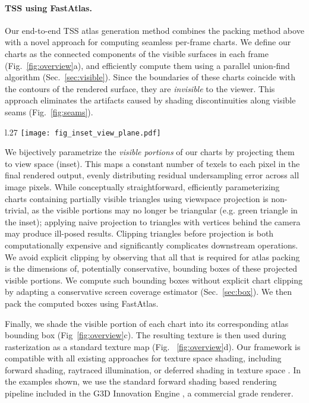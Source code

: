 \paragraph*{TSS using FastAtlas.}
Our end-to-end TSS atlas generation method combines the packing method above with a novel approach for computing seamless per-frame charts. 
We define our charts as the connected components of the visible surfaces in each frame (Fig.~\ref{fig:overview}a), and efficiently compute them using a parallel union-find algorithm (Sec.~\ref{sec:visible}). Since the boundaries of these charts coincide with the contours of the rendered surface, they are {\em invisible} to the viewer. This approach 
eliminates the artifacts caused by shading discontinuities along visible seams (Fig.~\ref{fig:seams}). 

\begin{parWithWrapFigure}
\begin{wrapfigure}{l}{.27\columnwidth}%
\texttt{[image: fig\_inset\_view\_plane.pdf]}%
\end{wrapfigure}
We bijectively parametrize the {\em visible portions} of our charts by projecting them to view space (inset). This maps a constant number of texels to each pixel in the final rendered output, evenly distributing residual undersampling error across all image pixels. While conceptually straightforward, efficiently parameterizing charts containing partially visible triangles using viewspace projection is non-trivial, as the visible portions may no longer be triangular (e.g. green triangle in the inset); applying naive projection to triangles with vertices behind the camera may produce ill-posed results. Clipping triangles before projection is both computationally expensive and significantly complicates downstream operations. We avoid explicit clipping by observing that all that is required for atlas packing is the dimensions of, potentially conservative, bounding boxes of these projected visible portions. We compute such bounding boxes without explicit chart clipping by adapting a conservative screen coverage estimator  (Sec.~\ref{sec:box}). We then pack the computed boxes using FastAtlas. 
\end{parWithWrapFigure}

Finally, we shade the visible portion of each chart into its corresponding atlas bounding box (Fig~\ref{fig:overview}c). 
The resulting texture is then used during rasterization as a standard texture map (Fig. ~\ref{fig:overview}d). 
Our framework is compatible with all existing approaches for texture space shading, including forward shading, raytraced illumination, or deferred shading in texture space \cite{baker:2016}. In the examples shown, we use the standard forward shading based rendering pipeline included in the G3D Innovation Engine \cite{G3D17}, a commercial grade renderer.
